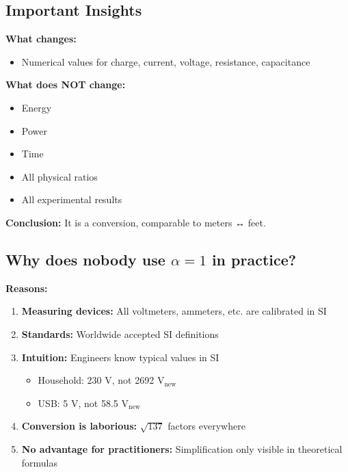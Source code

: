 	\subsection{Important Insights}
	
	\begin{tcolorbox}[colback=green!5!white,colframe=green!75!black,title=Core Statement]
		\textbf{What changes:}
		\begin{itemize}
			\item Numerical values for charge, current, voltage, resistance, capacitance
		\end{itemize}
		
		\textbf{What does NOT change:}
		\begin{itemize}
			\item Energy
			\item Power
			\item Time
			\item All physical ratios
			\item All experimental results
		\end{itemize}
		
		\textbf{Conclusion:} It is a conversion, comparable to meters ↔ feet.
	\end{tcolorbox}
	
	\subsection{Why does nobody use $\alpha = 1$ in practice?}
	
	\textbf{Reasons:}
	\begin{enumerate}
		\item \textbf{Measuring devices:} All voltmeters, ammeters, etc. are calibrated in SI
		
		\item \textbf{Standards:} Worldwide accepted SI definitions
		
		\item \textbf{Intuition:} Engineers know typical values in SI
		\begin{itemize}
			\item Household: 230 V, not 2692 V$_{\text{new}}$
			\item USB: 5 V, not 58.5 V$_{\text{new}}$
		\end{itemize}
		\item \textbf{Conversion is laborious:} $\sqrt{137}$ factors everywhere
		
		\item \textbf{No advantage for practitioners:} Simplification only visible in theoretical formulas
	\end{enumerate}
	
